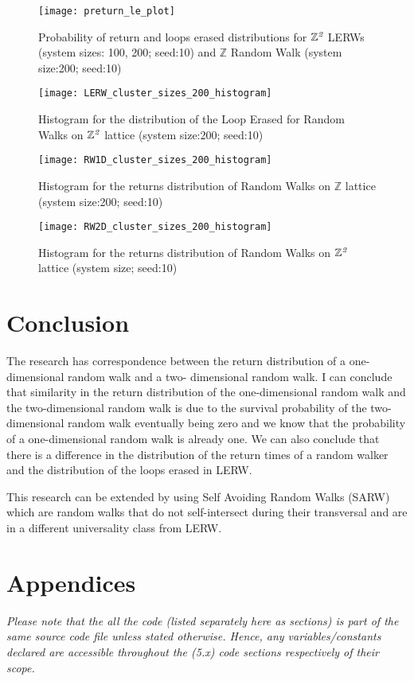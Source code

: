 \documentclass{article}
\begin{document}
\begin{figure}[H]
	\centering
		\texttt{[image: preturn\_le\_plot]}
		\caption{Probability of return and loops erased distributions for $\mathbb{Z}^{\emph{2}}$ LERWs (system sizes: 100, 200; seed:10) and $\mathbb{Z}$ Random Walk (system size:200; seed:10)}
		\label{fig:AREr}
\end{figure}
\begin{figure}[H]
	\centering
		\texttt{[image: LERW\_cluster\_sizes\_200\_histogram]}
		\caption{Histogram for the distribution of the Loop Erased for Random Walks on $\mathbb{Z}^{\emph{2}}$ lattice (system size:200; seed:10)}
		\label{fig:LERWhdish}
\end{figure}
\begin{figure}[H]
	\centering
		\texttt{[image: RW1D\_cluster\_sizes\_200\_histogram]}
		\caption{Histogram for the returns distribution of Random Walks on $\mathbb{Z}$ lattice (system size:200; seed:10)}
		\label{fig:RW1Dhdish}
\end{figure}
\begin{figure}[h]
	\centering
		\texttt{[image: RW2D\_cluster\_sizes\_200\_histogram]}
		\caption{Histogram for the returns distribution of Random Walks on $\mathbb{Z}^{\emph{2}}$ lattice (system size; seed:10)}
		\label{fig:RW2Dhdish}
\end{figure}
\newpage

\section{Conclusion}
The research has correspondence between the return distribution of a one-dimensional random walk and a two- dimensional random walk. I can conclude that similarity in the return distribution of the one-dimensional random walk and the two-dimensional random walk is due to the survival probability of the two-dimensional random walk eventually being zero and we know that the probability of a one-dimensional random walk is already one. We can also conclude that there is a difference in the distribution of the return times of a random walker and the distribution of the loops erased in LERW. \newline

This research can be extended by using Self Avoiding Random Walks (SARW) which are random walks that do not self-intersect during their transversal and are in a different universality class from LERW.


\section{Appendices}
	\emph{Please note that the all the code (listed separately here as sections) is part of the same source code file unless stated otherwise. Hence, any variables/constants declared are accessible throughout the (5.x) code sections respectively of their scope.}
\end{document}

